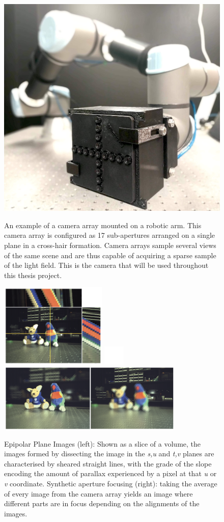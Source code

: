 \begin{figure}[tbp]
    \centering
    \includegraphics[width=4.5in]{images/robotcamera.jpg}
    \caption{An example of a camera array mounted on a robotic arm. This camera array is configured as 17 sub-apertures arranged on a single plane in a cross-hair formation. Camera arrays sample several views of the same scene and are thus capable of acquiring a sparse sample of the light field. This is the camera that will be used throughout this thesis project.}
    \label{cameraarray}
    \vspace{1cm}
    \includegraphics[width=2in]{images/epipolarimage.png}
    \includegraphics[width=0.4in]{images/blank.png}
    \includegraphics[width=3.5in]{images/refocus.png}
    \caption{Epipolar Plane Images (left): Shown as a slice of a volume, the images formed by dissecting the image in the \textit{s,u} and \textit{t,v} planes are characterised by sheared straight lines, with the grade of the slope encoding the amount of parallax experienced by a pixel at that \textit{u} or \textit{v} coordinate. Synthetic aperture focusing (right): taking the average of every image from the camera array yields an image where different parts are in focus depending on the alignments of the images.}
    \label{epiplaneimg}
\end{figure}


